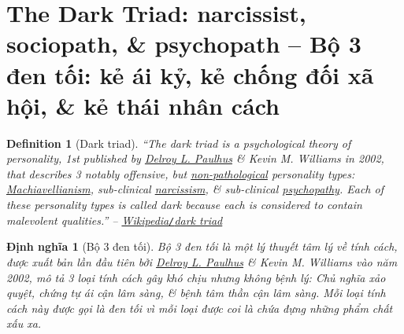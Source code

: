 \documentclass[12pt,twoside]{book}
\newtheorem{definition}{Definition}[section]
\newtheorem{dinhnghia}{Định nghĩa}[section]
\begin{document}
\section{The Dark Triad: narcissist, sociopath, \& psychopath -- Bộ 3 đen tối: kẻ ái kỷ, kẻ chống đối xã hội, \& kẻ thái nhân cách}

\begin{definition}[Dark triad]
	``The \emph{dark triad} is a psychological theory of personality, 1st published by \href{https://en.wikipedia.org/wiki/Delroy_L._Paulhus}{\sc Delroy L. Paulhus} \& {\sc Kevin M. Williams} in 2002, that describes 3 notably offensive, but \href{https://en.wikipedia.org/wiki/Psychopathology}{non-pathological} personality types: \href{https://en.wikipedia.org/wiki/Machiavellianism_(psychology)}{Machiavellianism}, sub-clinical \href{https://en.wikipedia.org/wiki/Narcissism}{narcissism}, \& sub-clinical \href{https://en.wikipedia.org/wiki/Psychopathy}{psychopathy}. Each of these personality types is called \emph{dark} because each is considered to contain malevolent qualities.'' -- \href{https://en.wikipedia.org/wiki/Dark_triad}{Wikipedia{\tt/}dark triad}
\end{definition}

\begin{dinhnghia}[Bộ 3 đen tối]
	\emph{Bộ 3 đen tối} là một lý thuyết tâm lý về tính cách, được xuất bản lần đầu tiên bởi \href{https://en.wikipedia.org/wiki/Delroy_L._Paulhus}{\sc Delroy L. Paulhus} \& {\sc Kevin M. Williams} vào năm 2002, mô tả 3 loại tính cách gây khó chịu nhưng không bệnh lý: Chủ nghĩa xảo quyệt, chứng tự ái cận lâm sàng, \& bệnh tâm thần cận lâm sàng. Mỗi loại tính cách này được gọi là \emph{đen tối} vì mỗi loại được coi là chứa đựng những phẩm chất xấu xa.
\end{dinhnghia}
\end{document}
